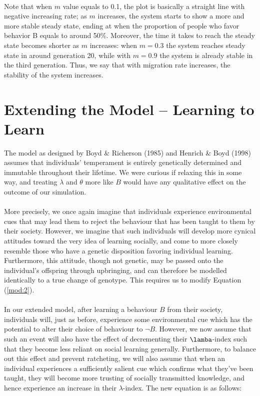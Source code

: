 \documentclass[a4paper,8pt]{extarticle}
\begin{document}
\\
Note that when $m$ value equals to 0.1, the plot is basically a straight line with negative increasing rate; as $m$ increases, the system starts to show a more and more stable steady state, ending at when the proportion of people who favor behavior B equals to around 50\%. Moreover, the time it takes to reach the steady state becomes shorter as $m$ increases: when $m = 0.3$ the system reaches steady state in around generation 20, while with $m = 0.9$ the system is already stable in the third generation. Thus, we say that with migration rate increases, the stability of the system increases.
\\
\section{Extending the Model -- Learning to Learn}
The model as designed by Boyd \& Richerson (1985) and Henrich \& Boyd (1998) assumes that individuals' temperament is entirely genetically determined and immutable throughout their lifetime. We were curious if relaxing this in some way, and treating $\lambda$ and $\theta$ more like $B$ would have any qualitative effect on the outcome of our simulation.
\\
\\
More precisely, we once again imagine that individuals experience environmental cues that may lead them to reject the behaviour that has been taught to them by their society. However, we imagine that such individuals will develop more cynical attitudes toward the very idea of learning socially, and come to more closely resemble those who have a genetic disposition favoring individual learning. Furthermore, this attitude, though not genetic, may be passed onto the individual's offspring through upbringing, and can therefore be modelled identically to a true change of genotype. This requires us to modify Equation (\ref{mod:2}).
\\
\\
In our extended model, after learning a behaviour $B$ from their society, individuals will, just as before, experience some environmental cue which has the potential to alter their choice of behaviour to $\lnot B$. However, we now assume that such an event will also have the effect of decrementing their $\lamba$-index such that they become less reliant on social learning generally. Furthermore, to balance out this effect and prevent ratcheting, we will also assume that when an individual experiences a sufficiently salient cue which confirms what they've been taught, they will become more trusting of socially transmitted knowledge, and hence experience an increase in their $\lambda$-index. The new equation is as follows:
\end{document}
